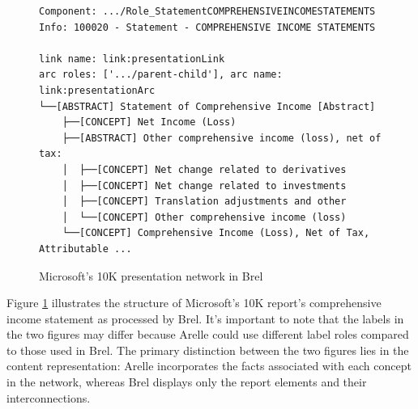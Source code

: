 \begin{figure}[H]
    \begin{lstlisting}[basicstyle=\small\ttfamily]
Component: .../Role_StatementCOMPREHENSIVEINCOMESTATEMENTS
Info: 100020 - Statement - COMPREHENSIVE INCOME STATEMENTS

link name: link:presentationLink
arc roles: ['.../parent-child'], arc name: link:presentationArc
└──[ABSTRACT] Statement of Comprehensive Income [Abstract]
    ├──[CONCEPT] Net Income (Loss)
    ├──[ABSTRACT] Other comprehensive income (loss), net of tax:
    │  ├──[CONCEPT] Net change related to derivatives
    │  ├──[CONCEPT] Net change related to investments
    │  ├──[CONCEPT] Translation adjustments and other
    │  └──[CONCEPT] Other comprehensive income (loss)
    └──[CONCEPT] Comprehensive Income (Loss), Net of Tax, Attributable ...
\end{lstlisting}
    \caption{Microsoft's 10K presentation network in Brel\cite{microsoft_edgar}}
    \label{fig:msft_income_statement_network}
\end{figure}



Figure \ref{fig:msft_income_statement_network} illustrates the structure of Microsoft's 10K report's comprehensive income statement as processed by Brel.  
It's important to note that the labels in the two figures may differ because Arelle could use different label roles compared to those used in Brel.  
The primary distinction between the two figures lies in the content representation: Arelle incorporates the facts associated with each concept in the network,  
whereas Brel displays only the report elements and their interconnections.

